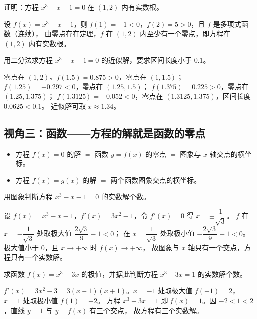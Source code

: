 \begin{explore}
\begin{example}
证明：方程 $x^3-x-1=0$ 在 $(1,2)$ 内有实数根。
\end{example}
\begin{solution}
设 $f(x)=x^3-x-1$，则 $f(1)=-1<0$，$f(2)=5>0$，且 $f$ 是多项式函数（连续），
由零点存在定理，$f$ 在 $(1,2)$ 内至少有一个零点，即方程在 $(1,2)$ 内有实数根。
\end{solution}

\begin{problem}
用二分法求方程 $x^3-x-1=0$ 的近似解，要求区间长度小于 $0.1$。
\end{problem}
\begin{solution}
零点在 $(1,2)$。$f(1.5)=0.875>0$，零点在 $(1,1.5)$；
$f(1.25)=-0.297<0$，零点在 $(1.25,1.5)$；
$f(1.375)=0.225>0$，零点在 $(1.25,1.375)$；
$f(1.3125)=-0.052<0$，零点在 $(1.3125,1.375)$，区间长度 $0.0625<0.1$。
近似解可取 $x\approx1.34$。
\end{solution}

\subsection{视角三：函数——方程的解就是函数的零点}

\begin{itemize}
  \item 方程 $f(x)=0$ 的解 $=$ 函数 $y=f(x)$ 的零点 $=$ 图象与 $x$ 轴交点的横坐标。
  \item 方程 $f(x)=g(x)$ 的解 $=$ 两个函数图象交点的横坐标。
\end{itemize}

\begin{example}
用图象判断方程 $x^3-x-1=0$ 的实数解个数。
\end{example}
\begin{solution}
设 $f(x)=x^3-x-1$，$f'(x)=3x^2-1$，令 $f'(x)=0$ 得 $x=\pm\dfrac{1}{\sqrt3}$。
$f$ 在 $x=-\dfrac{1}{\sqrt3}$ 处取极大值 $\dfrac{2\sqrt3}{9}-1<0$；
在 $x=\dfrac{1}{\sqrt3}$ 处取极小值 $-\dfrac{2\sqrt3}{9}-1<0$。
极大值小于 $0$，且 $x\to+\infty$ 时 $f(x)\to+\infty$，
故图象与 $x$ 轴只有一个交点，方程只有一个实数解。
\end{solution}

\begin{problem}
求函数 $f(x)=x^3-3x$ 的极值，并据此判断方程 $x^3-3x=1$ 的实数解个数。
\end{problem}
\begin{solution}
$f'(x)=3x^2-3=3(x-1)(x+1)$。$x=-1$ 处取极大值 $f(-1)=2$，$x=1$ 处取极小值 $f(1)=-2$。
方程 $x^3-3x=1$ 即 $f(x)=1$。因 $-2<1<2$，直线 $y=1$ 与 $y=f(x)$ 有三个交点，
故方程有三个实数解。
\end{solution}


\end{explore}
